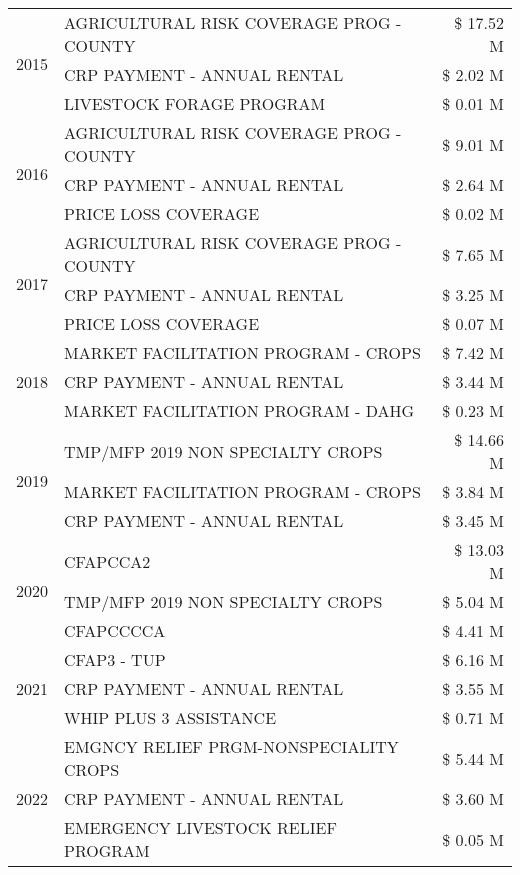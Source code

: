 \begin{tabular}{llr}
\multirow[t]{3}{*}{2015} & AGRICULTURAL RISK COVERAGE PROG - COUNTY & \$ 17.52 M \\
 & CRP PAYMENT - ANNUAL RENTAL & \$ 2.02 M \\
 & LIVESTOCK FORAGE PROGRAM & \$ 0.01 M \\
\cline{1-3}
\multirow[t]{3}{*}{2016} & AGRICULTURAL RISK COVERAGE PROG - COUNTY & \$ 9.01 M \\
 & CRP PAYMENT - ANNUAL RENTAL & \$ 2.64 M \\
 & PRICE LOSS COVERAGE & \$ 0.02 M \\
\cline{1-3}
\multirow[t]{3}{*}{2017} & AGRICULTURAL RISK COVERAGE PROG - COUNTY & \$ 7.65 M \\
 & CRP PAYMENT - ANNUAL RENTAL & \$ 3.25 M \\
 & PRICE LOSS COVERAGE & \$ 0.07 M \\
\cline{1-3}
\multirow[t]{3}{*}{2018} & MARKET FACILITATION PROGRAM - CROPS & \$ 7.42 M \\
 & CRP PAYMENT - ANNUAL RENTAL & \$ 3.44 M \\
 & MARKET FACILITATION PROGRAM - DAHG & \$ 0.23 M \\
\cline{1-3}
\multirow[t]{3}{*}{2019} & TMP/MFP 2019 NON SPECIALTY CROPS & \$ 14.66 M \\
 & MARKET FACILITATION PROGRAM - CROPS & \$ 3.84 M \\
 & CRP PAYMENT - ANNUAL RENTAL & \$ 3.45 M \\
\cline{1-3}
\multirow[t]{3}{*}{2020} & CFAPCCA2 & \$ 13.03 M \\
 & TMP/MFP 2019 NON SPECIALTY CROPS & \$ 5.04 M \\
 & CFAPCCCCA & \$ 4.41 M \\
\cline{1-3}
\multirow[t]{3}{*}{2021} & CFAP3 - TUP & \$ 6.16 M \\
 & CRP PAYMENT - ANNUAL RENTAL & \$ 3.55 M \\
 & WHIP PLUS 3 ASSISTANCE & \$ 0.71 M \\
\cline{1-3}
\multirow[t]{3}{*}{2022} & EMGNCY RELIEF PRGM-NONSPECIALITY CROPS & \$ 5.44 M \\
 & CRP PAYMENT - ANNUAL RENTAL & \$ 3.60 M \\
 & EMERGENCY LIVESTOCK RELIEF PROGRAM & \$ 0.05 M \\
\cline{1-3}
\bottomrule
\end{tabular}
